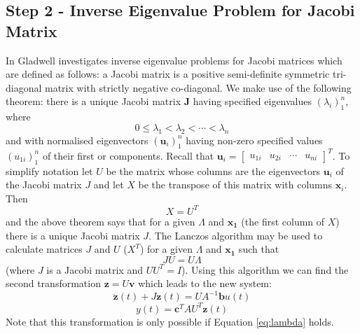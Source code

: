 \documentclass{mbd_fullpaper}
\begin{document}
\subsection{Step 2 - Inverse Eigenvalue Problem for Jacobi Matrix}
In \cite{gladwell1986inverse} Gladwell investigates inverse eigenvalue problems for Jacobi matrices which are defined as follows:
a Jacobi matrix is a positive semi-definite symmetric tri-diagonal matrix with strictly negative co-diagonal.
We make use of the following theorem: there is a unique Jacobi matrix $\mathbf{J}$ having specified eigenvalues $(\lambda_i)_1^n$, where
\begin{equation}
0 \leq \lambda_1<\lambda_2< \cdots <\lambda_n
\label{eq:lambda}
\end{equation}
and with normalised eigenvectors $(\mathbf{u}_i)_1^n$  having non-zero specified values $(u_{1i})_1^n$ of their first or components.
Recall that $\mathbf{u}_i = \begin{bmatrix} u_{1i} &  u_{2i} & \cdots & u_{ni} \end{bmatrix}^T$.
To simplify notation let $U$ be the matrix whose columns are the eigenvectors $\mathbf{u}_i$ of the Jacobi matrix $J$ and let $X$ be the transpose of this matrix with columns $\mathbf{x}_i$.
Then
\begin{equation}
X=U^T
\end{equation}
and the above theorem says that for a given $\Lambda$ and $\mathbf{x_1}$ (the first column of $X$) there is a unique Jacobi matrix $J$.
The Lanczos algorithm may be used to calculate matrices $J$ and $U$ ($X^T$) for a given $\Lambda$ and $\mathbf{x_1}$ such that 
\begin{equation}
J U = U \Lambda
\end{equation}
(where $J$ is a Jacobi matrix and $U U^T = I$).
Using this algorithm we can find the second transformation $\mathbf{z} = U \mathbf{v}$ which leads to the new system:
\begin{equation}
\ddot{\mathbf{z}}(t) + J \mathbf{z}(t) =   U A^{-1} \mathbf{b}u(t)
\label{eq:jacobi1}
\end{equation}
\begin{equation}
y(t) = \mathbf{c}^T  A U^T \mathbf{z}(t)
\label{eq:jacobi2}
\end{equation}
Note that this transformation is only possible if Equation \ref{eq:lambda} holds.
\end{document}
